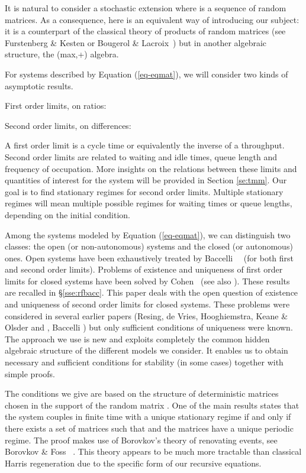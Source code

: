 \documentclass[11pt,titlepage]{article}
\newcommand{\parag}{\medskip\noindent}
\begin{document}
It is natural to consider a stochastic extension
where  is a
sequence of random matrices.
As a consequence, here is an equivalent way of introducing our subject: it is
a counterpart of the classical theory of products of random matrices (see
Furstenberg \& Kesten \cite{FuKe} or Bougerol \& Lacroix~\cite{BoLa}) but in
another algebraic structure, the (max,+) algebra.

\parag
For systems described by Equation (\ref{eq-eqmat}), we will consider
two kinds of asymptotic results.

\parag

\hspace*{1cm}  First order limits, on ratios:
 
\hspace*{1cm}  Second order limits, on differences:
 

A first order limit is a cycle time or equivalently the inverse of a
throughput.
Second order limits
are related to waiting and idle 
times, queue length and frequency of occupation.
More insights on the relations between these limits and quantities of interest
for the system will be provided in Section \ref{se:tmm}. Our 
goal is to find 
stationary regimes for second order limits. Multiple
stationary regimes will mean multiple possible regimes for waiting
times or queue lengths, depending on the initial condition.

\parag
Among the systems modeled by Equation (\ref{eq-eqmat}), we can distinguish
two classes: the open (or non-autonomous) systems and the closed (or
autonomous) ones. Open systems have been exhaustively treated by  
Baccelli~\cite{bacc92}~\cite{BCOQ} (for both first and second order
limits).  
Problems of existence and uniqueness of first order limits for closed systems
have been 
solved by Cohen~\cite{cohe} (see also \cite{bacc92}). These results are
recalled in \S \ref{sse:rfbacc}. 
This paper deals with the open question of existence and uniqueness of second
order limits  for
closed systems. These problems were considered
in several earlier
papers (Resing, de Vries, Hooghiemstra, Keane \& Olsder \cite{Ral90} and
\cite{Oal90}, Baccelli \cite{bacc92}) but only sufficient 
conditions of
uniqueness were known. 
The approach we use is new
and exploits completely the common hidden algebraic structure of the
different models we consider. It enables us to obtain necessary and
sufficient conditions for stability (in some cases) together with simple proofs.

\parag

The conditions we give
are based on the structure of
deterministic matrices chosen in the support of the random matrix
. One of the main results states that the
system couples  
in finite time with a unique stationary regime if and only
if there exists a set of matrices  such that 
and the matrices  have a unique periodic regime.
The proof makes use of Borovkov's theory of renovating events, see Borovkov \&
Foss \cite{BoFo92}~\cite{BoFo94}.
This theory 
appears to be much more tractable than classical Harris regeneration
due to the specific form of our recursive equations. 
\end{document}
